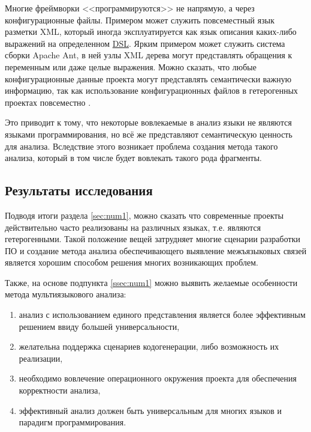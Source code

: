 Многие фреймворки <<программируются>> не напрямую, а через конфигурационные файлы. Примером может служить
повсеместный язык разметки XML, который иногда эксплуатируется как язык описания каких-либо выражений на
определенном \hyperlink{DSL}{DSL}. Ярким примером может служить система сборки Apache Ant, в ней узлы XML дерева
могут представлять обращения к переменным или даже целые выражения. Можно сказать, что любые конфигурационные
данные проекта могут представлять семантически важную информацию, так как использование конфигурационных
файлов в гетерогенных проектах повсеместно \cite{external-dependencies}.

Это приводит к тому, что некоторые вовлекаемые в анализ языки не являются языками программирования, но
всё же представляют семантическую ценность для анализа. Вследствие этого возникает проблема создания
метода такого анализа, который в том числе будет вовлекать такого рода фрагменты.

\subsection{Результаты исследования}

Подводя итоги раздела \ref{sec:num1}, можно сказать что современные проекты действительно
часто реализованы на различных языках, т.е. являются гетерогенными. Такой положение вещей
затрудняет многие сценарии разработки ПО и создание метода анализа обеспечивающего выявление межъязыковых
связей является хорошим способом решения многих возникающих проблем.

Также, на основе подпункта \ref{ssec:num1} можно выявить желаемые особенности метода мультиязыкового анализа:
\begin{enumerate}[label=\arabic*.]
    \item анализ с использованием единого представления является более эффективным решением ввиду большей универсальности,
    \item желательна поддержка сценариев кодогенерации, либо возможность их реализации,
    \item необходимо вовлечение операционного окружения проекта для обеспечения корректности анализа,
    \item эффективный анализ должен быть универсальным для многих языков и парадигм программирования.
\end{enumerate}

\clearpage